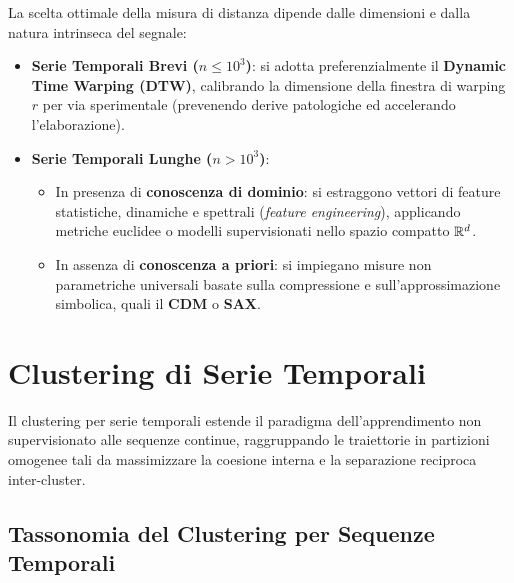 La scelta ottimale della misura di distanza dipende dalle dimensioni e dalla natura intrinseca del segnale:
\begin{itemize}
    \item \textbf{Serie Temporali Brevi ($n \le 10^3$)}: si adotta preferenzialmente il \textbf{Dynamic Time Warping (DTW)}, calibrando la dimensione della finestra di warping $r$ per via sperimentale (prevenendo derive patologiche ed accelerando l'elaborazione).
    \item \textbf{Serie Temporali Lunghe ($n > 10^3$)}:
    \begin{itemize}
        \item In presenza di \textbf{conoscenza di dominio}: si estraggono vettori di feature statistiche, dinamiche e spettrali (\textit{feature engineering}), applicando metriche euclidee o modelli supervisionati nello spazio compatto $\mathbb{R}^d$.
        \item In assenza di \textbf{conoscenza a priori}: si impiegano misure non parametriche universali basate sulla compressione e sull'approssimazione simbolica, quali il \textbf{CDM} o \textbf{SAX}.
    \end{itemize}
\end{itemize}

\FloatBarrier
\section{Clustering di Serie Temporali}
\label{sec:ts-clustering}

Il clustering per serie temporali estende il paradigma dell'apprendimento non supervisionato alle sequenze continue, raggruppando le traiettorie in partizioni omogenee tali da massimizzare la coesione interna e la separazione reciproca inter-cluster.

\FloatBarrier
\subsection{Tassonomia del Clustering per Sequenze Temporali}
\label{subsec:ts-clustering-taxonomy}

